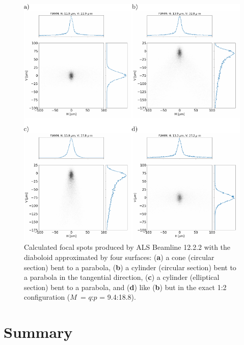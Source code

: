 \documentclass[preprint]{iucr}       %
\begin{document}
\begin{figure}\label{fig:finalcomparison}
\includegraphics[width=1.0\textwidth]{figures/fig9.pdf}
% 


\caption{Calculated focal spots produced by ALS Beamline 12.2.2 with the diaboloid approximated by four surfaces: (\textbf{a}) a cone (circular section) bent to a parabola, (\textbf{b}) a cylinder (circular section) bent to a parabola in the tangential direction, (\textbf{c}) a cylinder (elliptical section) bent to a parabola, and (\textbf{d}) like (\textbf{b}) but in the exact 1:2 configuration ($M$~= $q$:$p$ = 9.4:18.8).}
\end{figure}

\section{Summary}
\label{sec:summary}
\end{document}
